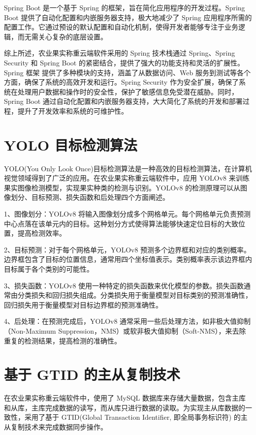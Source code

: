 Spring Boot 是一个基于 Spring 的框架，旨在简化应用程序的开发过程。Spring Boot 提供了自动化配置和内嵌服务器支持，极大地减少了 Spring 应用程序所需的配置工作。它通过预设的默认配置和自动化机制，使得开发者能够专注于业务逻辑，而无需关心复杂的底层设置\cite{Spring-Boot-概述}。

综上所述，农业果实称重云端软件采用的 Spring 技术栈通过 Spring、Spring Security 和 Spring Boot 的紧密结合，提供了强大的功能支持和灵活的扩展性。Spring 框架 提供了多种模块的支持，涵盖了从数据访问、Web 服务到测试等各个方面，确保了系统的高效开发和运行。Spring Security 作为安全扩展，确保了系统在处理用户数据和操作时的安全性，保护了敏感信息免受潜在威胁。同时，Spring Boot 通过自动化配置和内嵌服务器支持，大大简化了系统的开发和部署过程，提升了开发效率和系统的可维护性。

\section{YOLO 目标检测算法}\label{sec:yolo}

YOLO(You Only Look Once)目标检测算法是一种高效的目标检测算法，在计算机视觉领域得到了广泛的应用\cite{Lin2019}。在农业果实称重云端软件中，应用 YOLOv8 来训练果实图像检测模型，实现果实种类的检测与识别。YOLOv8 的检测原理可以从图像划分、目标预测、损失函数和后处理四个方面阐述。

1、图像划分：YOLOv8 将输入图像划分成多个网格单元。每个网格单元负责预测中心点落在该单元内的目标。这种划分方式使得算法能够快速定位目标的大致位置，提高检测效率\cite{Liu2023-yolov8}。

2、目标预测：对于每个网格单元，YOLOv8 预测多个边界框和对应的类别概率。边界框包含了目标的位置信息，通常用四个坐标值表示。类别概率表示该边界框内目标属于各个类别的可能性。

3、损失函数：YOLOv8 使用一种特定的损失函数来优化模型的参数。损失函数通常由分类损失和回归损失组成。分类损失用于衡量模型对目标类别的预测准确性，回归损失用于衡量模型对目标边界框的预测准确性。

4、后处理：在预测完成后，YOLOv8 通常采用一些后处理方法，如非极大值抑制（Non-Maximum Suppression，NMS）或软非极大值抑制（Soft-NMS）\cite{SuperYOLO8}，来去除重复的检测结果，提高检测的准确性。

\section{基于 GTID 的主从复制技术}\label{sec:gtid}

在农业果实称重云端软件中，使用了 MySQL 数据库来存储大量数据，包含主库和从库，主库完成数据的读写，而从库只进行数据的读取。为实现主从库数据的一致性，采用了基于 GTID(Global Transaction Identifier, 即全局事务标识符) 的主从复制技术来完成数据同步操作。

